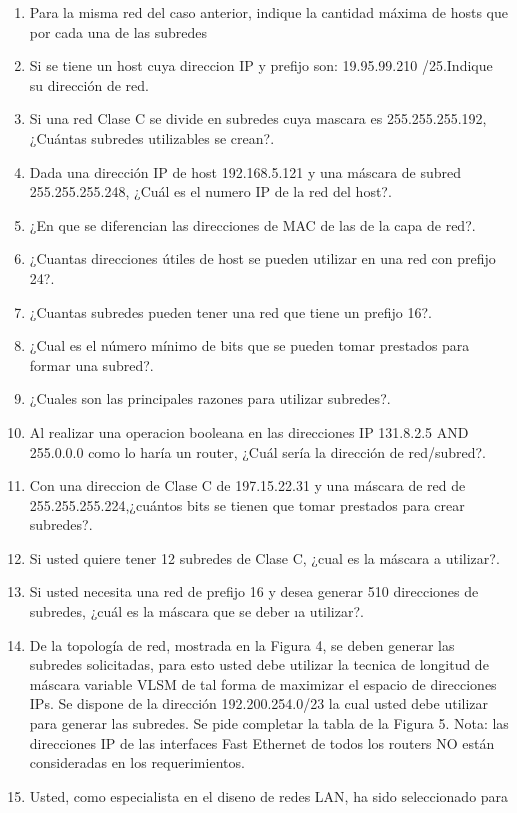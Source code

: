 \documentclass{udparticle}
\begin{document}
\begin{enumerate}
\item Para la misma red del caso anterior, indique la cantidad máxima de hosts que por cada una de las subredes
\item Si se tiene un host cuya direccion IP y prefijo son: 19.95.99.210 
/25.Indique su dirección de red.
\item Si una red Clase C se divide en subredes cuya mascara es 255.255.255.192, ¿Cuántas subredes utilizables se crean?.
\item Dada una dirección IP de host 192.168.5.121 y una máscara de 
subred 255.255.255.248, ¿Cuál es el numero IP de la red del host?.
\item ¿En que se diferencian las direcciones de MAC de las de la capa de red?.
\item ¿Cuantas direcciones útiles de host se pueden utilizar en una red con prefijo 24?.
\item ¿Cuantas subredes pueden tener una red que tiene un prefijo 16?.
\item ¿Cual es el número mínimo de bits que se pueden tomar prestados para formar una subred?.
\item ¿Cuales son las principales razones para utilizar subredes?.
\item Al realizar una operacion booleana en las direcciones IP 131.8.2.5
AND 255.0.0.0 como lo haría un router, ¿Cuál sería la dirección de 
red/subred?.
\item Con una direccion de Clase C de 197.15.22.31 y una máscara de red 
de 255.255.255.224,¿cuántos bits se tienen que tomar prestados para 
crear subredes?.
\item Si usted quiere tener 12 subredes de Clase C, ¿cual es la máscara 
a utilizar?.
\item Si usted necesita una red de prefijo 16 y desea generar 510 
direcciones de subredes, ¿cuál es la máscara que se deber ıa utilizar?.
\item De la topología de red, mostrada en la Figura 4, se deben generar 
las subredes solicitadas, para esto usted debe utilizar la tecnica de 
longitud de máscara variable VLSM de tal forma de maximizar el espacio 
de direcciones IPs. Se dispone de la dirección 192.200.254.0/23 la cual 
usted debe utilizar para generar las subredes. Se pide completar la 
tabla de la Figura 5. Nota: las direcciones IP de las interfaces Fast 
Ethernet de todos los routers NO están consideradas en los requerimientos.
\item Usted, como especialista en el diseno de redes LAN, ha sido seleccionado para

\end{enumerate}
\end{document}
